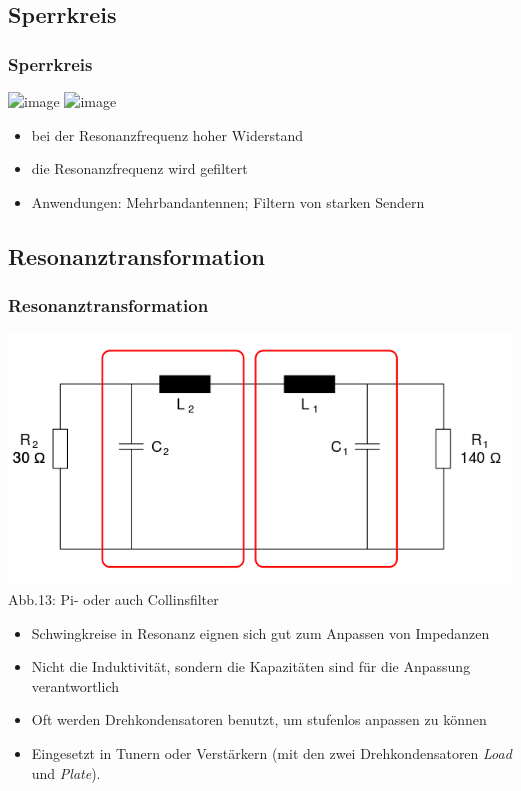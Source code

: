 \subsection*{Sperrkreis}
\begin{frame}
  \frametitle{Sperrkreis}
  \begin{center}
    \includegraphics<1>[width=\textwidth,height=.5\textheight,keepaspectratio]{e07/Sperrkreis.png}
    \includegraphics<2>[width=\textwidth,height=.5\textheight,keepaspectratio]{e07/ParallelschwSig.png}
  \end{center}
  \pause
  \begin{itemize}
    \item bei der Resonanzfrequenz hoher Widerstand
    \item die Resonanzfrequenz wird gefiltert
    \item Anwendungen: Mehrbandantennen; Filtern von starken Sendern
  \end{itemize}
\end{frame}

\subsection*{Resonanz\-trans\-formation}
\begin{frame}
  \frametitle{Resonanztransformation}
  \begin{center}
    \includegraphics[scale=0.2]{a04/Pi-Filter.png}\\
    Abb.13: Pi- oder auch Collinsfilter \cite{wpde}
  \end{center}
  \begin{itemize}
    \item Schwingkreise in Resonanz eignen sich gut zum Anpassen von Impedanzen
    \item Nicht die Induktivität, sondern die Kapazitäten sind für die Anpassung verantwortlich
    \item Oft werden Drehkondensatoren benutzt, um stufenlos anpassen zu können
    \item Eingesetzt in Tunern oder Verstärkern (mit den zwei Drehkondensatoren \emph{Load} und \emph{Plate}).
  \end{itemize}
\end{frame}

